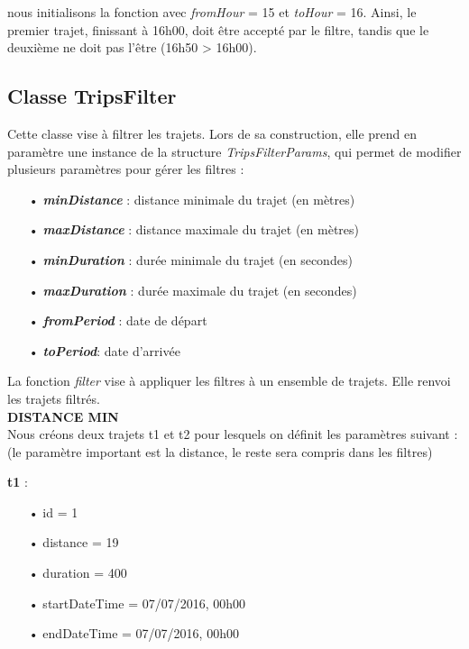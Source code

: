 \documentclass[12pt]{article}
\begin{document}
	nous initialisons la fonction avec \textit{fromHour} = 15 et \textit{toHour} = 16. Ainsi, le premier trajet, finissant à 16h00, doit être accepté par le filtre, tandis que le deuxième ne doit pas l’être (16h50 > 16h00).\\

	\subsection{Classe TripsFilter}
	Cette classe vise à filtrer les trajets. Lors de sa construction, elle prend en paramètre une instance de la structure \textit{TripsFilterParams}, qui permet de modifier plusieurs paramètres pour gérer les filtres :\\
	\begin{itemize}
	\item[•] \textbf{\textit{minDistance}} : distance minimale du trajet (en mètres)
	\item[•] \textbf{\textit{maxDistance}} : distance maximale du trajet (en mètres)
	\item[•] \textbf{\textit{minDuration}} : durée minimale du trajet (en secondes)
	\item[•] \textbf{\textit{maxDuration}} : durée maximale du trajet (en secondes)
	\item[•] \textbf{\textit{fromPeriod}} : date de départ
	\item[•] \textbf{\textit{toPeriod}}: date d’arrivée	
	\end{itemize}
		
	La fonction \textit{filter} vise à appliquer les filtres à un ensemble de trajets. Elle renvoi les trajets filtrés.\\

	\textbf{DISTANCE MIN}\\
	Nous créons deux trajets t1 et t2 pour lesquels on définit les paramètres suivant : (le paramètre important est la distance, le reste sera compris dans les filtres)

	\textbf{t1} :\\
	\begin{itemize}
	\item[•] id = 1
	\item[•] distance = 19
	\item[•] duration = 400
	\item[•] startDateTime = 07/07/2016, 00h00
	\item[•] endDateTime = 07/07/2016, 00h00
	\end{itemize}
	
\end{document}
